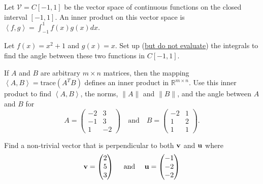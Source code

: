 \begin{problem}
Let $\mathcal{V} = C[-1,1]$ be the vector space of continuous functions on the closed
interval $[-1,1]$.  An inner product on this vector space is $\left< f,g\right> =
\int_{-1}^1 f(x) g(x) dx$.  

        Let $f(x) = x^2 + 1$ and $g(x) = x$.  Set up (\underline{but do not evaluate}) the
        integrals to find the angle between these two functions in $C[-1,1]$.  
\end{problem}

\begin{problem}
    If $A$ and $B$ are arbitrary $m \times n$ matrices, then the mapping $\left<
    A,B\right> = \text{trace}(A^TB)$ defines an inner product in $\mathbb{R}^{m\times n}$.
    Use this inner product to find $\left<A,B\right>$, the norms, $\|A\|$ and $\|B\|$, and
    the angle between $A$ and $B$ for
    \[ A = \begin{pmatrix} -2 & 3 \\ -1 & 3 \\ 1 & -2 \end{pmatrix} \quad \text{and} \quad
            B = \begin{pmatrix} -2 & 1 \\ 1 & 2 \\ 1 & 1 \end{pmatrix}. \]
\end{problem}

\begin{problem}
    Find a non-trivial vector that is perpendicular to both ${\bf v}$ and ${\bf u}$ where
    \[ {\bf v} = \begin{pmatrix} 2 \\ 5 \\ 3 \end{pmatrix} \quad \text{ and } \quad {\bf u} =
            \begin{pmatrix} -1 \\ -2 \\ -2 \end{pmatrix} \]
\end{problem}

